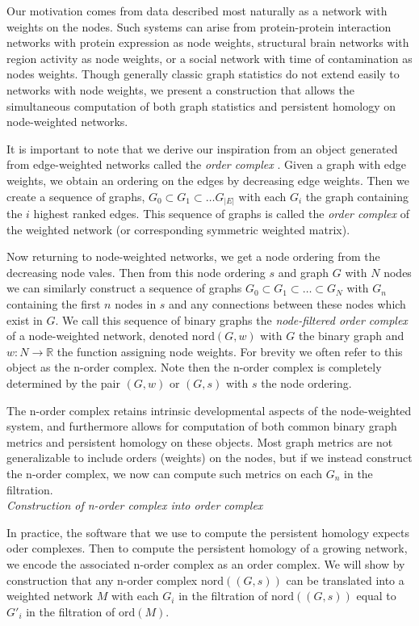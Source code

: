 \documentclass{article}
\begin{document}
Our motivation comes from data described most naturally as a network with weights on the nodes. Such systems can arise from protein-protein interaction networks with protein expression as node weights, structural brain networks with region activity as node weights, or a social network with time of contamination as nodes weights. Though generally classic graph statistics do not extend easily to networks with node weights, we present a construction that allows the simultaneous computation of both graph statistics and persistent homology on node-weighted networks.

It is important to note that we derive our inspiration from an object generated from edge-weighted networks called the \emph{order complex} \cite{giusti2015clique}. Given a graph with edge weights, we obtain an ordering on the edges by decreasing edge weights. Then we create a sequence of graphs, $G_0 \subset G_1 \subset \dots G_{|E|}$ with each $G_i$ the graph containing the $i$ highest ranked edges. This sequence of graphs is called the \emph{order complex} of the weighted network (or corresponding symmetric weighted matrix).

Now returning to node-weighted networks, we get a node ordering from the decreasing node vales. Then from this node ordering $s$ and graph $G$ with $N$ nodes we can similarly construct a sequence of graphs $G_0 \subset G_1 \subset \dots \subset G_N$ with $G_n$ containing the first $n$ nodes in $s$ and any connections between these nodes which exist in $G$. We call this sequence of binary graphs the \emph{node-filtered order complex} of a node-weighted network, denoted nord$(G,w)$ with $G$ the binary graph and $w:N \rightarrow \mathbb{R}$ the function assigning node weights. For brevity we often refer to this object as the n-order complex. Note then the n-order complex is completely determined by the pair $(G,w)$ or $(G,s)$ with $s$ the node ordering.

The n-order complex retains intrinsic developmental aspects of the node-weighted system, and furthermore allows for computation of both common binary graph metrics and persistent homology on these objects. Most graph metrics are not generalizable to include orders (weights) on the nodes, but if we instead construct the n-order complex, we now can compute such metrics on each $G_n$ in the filtration.\\

\noindent\emph{Construction of n-order complex into order complex}

In practice, the software that we use to compute the persistent homology expects oder complexes. Then to compute the persistent homology of a growing network, we encode the associated n-order complex as an order complex. We will show by construction that any n-order complex $\text{nord}((G,s))$ can be translated into a weighted network $M$ with each $G_i$ in the filtration of $\text{nord}((G,s))$ equal to $G'_i$ in the filtration of $\text{ord}(M)$.
\end{document}
